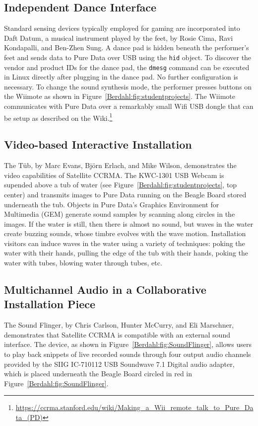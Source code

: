 \subsection{Independent Dance Interface}
Standard sensing devices typically employed for gaming are incorporated into Daft Datum, a musical instrument played by the feet, by Rosie Cima, Ravi Kondapalli, and Ben-Zhen Sung.  A dance pad is hidden beneath the performer's feet and sends data to Pure Data over USB using the \texttt{hid} object.  To discover the vendor and product IDs for the dance pad, the \texttt{dmesg} command can be executed in Linux directly after plugging in the dance pad.  No further configuration is necessary.  To change the sound synthesis mode, the performer presses buttons on the Wiimote as shown in Figure~\ref{Berdahl:fig:studentprojects}.  The Wiimote communicates with Pure Data over a remarkably small Wifi USB dongle that can be setup as described on the Wiki.\footnote{
\url{https://ccrma.stanford.edu/wiki/Making_a_Wii_remote_talk_to_Pure_Data_(PD)}}



\subsection{Video-based Interactive Installation}
The T\"ub,  by Marc Evans, Bj\"orn Erlach, and Mike Wilson, demonstrates the video capabilities of Satellite CCRMA.  The KWC-1301 USB Webcam is supended above a tub of water (see Figure~\ref{Berdahl:fig:studentprojects}, top center) and transmits images to Pure Data running on the Beagle Board stored underneath the tub.  Objects in Pure Data's Graphics Environment for Multimedia (GEM) generate sound samples by scanning along circles in the images.  If the water is still, then there is almost no sound, but waves in the water create buzzing sounds, whose timbre evolves with the wave motion.  Installation visitors can induce waves in the water using a variety of techniques: poking the water with their hands, pulling the edge of the tub with their hands, poking the water with tubes, blowing water through tubes, etc.



\subsection{Multichannel Audio in a Collaborative Installation Piece}
The Sound Flinger, by Chris Carlson, Hunter McCurry, and Eli Marschner, demonstrates that Satellite CCRMA is compatible with an external sound interface.  The device, as shown in Figure~\ref{Berdahl:fig:SoundFlinger}, allows users to play back snippets of live recorded sounds through four output audio channels provided by the SIIG IC-710112 USB Soundwave 7.1 Digital audio adapter, which is placed underneath the Beagle Board circled in red in Figure~\ref{Berdahl:fig:SoundFlinger}.




